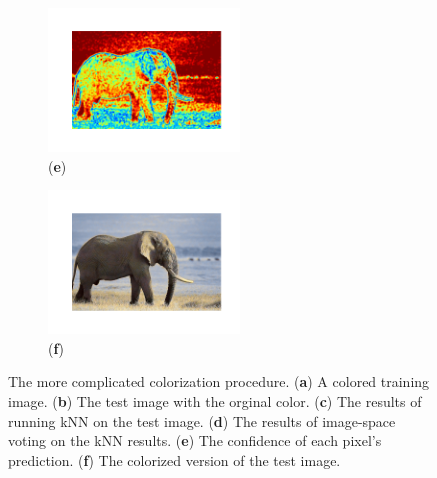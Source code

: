 \begin{figure}[H]
    \begin{subfigure}{2.1in}
        \centering
        \includegraphics[width=2in]{./Images/4.png}
        \caption{(\textbf{e})}
    \end{subfigure}
    \begin{subfigure}{2.1in}
        \centering
        \includegraphics[width=2in]{./Images/5.png}
        \caption{(\textbf{f})}
    \end{subfigure}
    \caption{The more complicated colorization procedure. (\textbf{a}) A colored training image. (\textbf{b}) The test image with the orginal color. (\textbf{c})  The results of running kNN on the test image. (\textbf{d})  The results of image-space voting on the kNN results. (\textbf{e})  The confidence of each pixel's prediction. (\textbf{f})  The colorized version of the test image.}
    \label{fig:elephants}
\end{figure}

